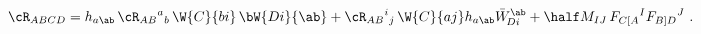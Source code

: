 \begin{equation}
  \cR_{ABCD} = h_{a\ab}\, \cR_{AB}{}^a{}_b\, \W{C}{bi}\, \bW{Di}{\ab} +
  \cR_{AB}{}^i{}_j\, \W{C}{aj} h_{a\ab} \bar{W}_{\!Di}^\ab + \half
  M_{IJ}\, F_{C[A}{}^I F_{B]D}{}^J\ .
 \end{equation}

